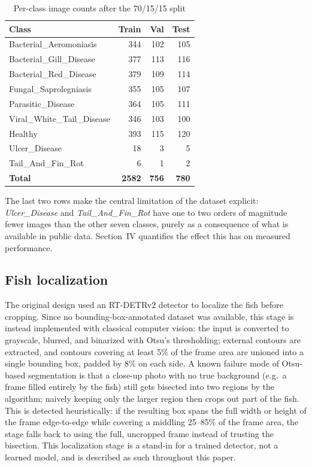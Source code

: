 \documentclass[conference]{IEEEtran}
\begin{document}
\begin{table}[htbp]
\caption{Per-class image counts after the 70/15/15 split}
\label{tab:dataset}
\centering
\begin{tabular}{lrrr}
\toprule
\textbf{Class} & \textbf{Train} & \textbf{Val} & \textbf{Test} \\
\midrule
Bacterial\_Aeromoniasis   & 344 & 102 & 105 \\
Bacterial\_Gill\_Disease  & 377 & 113 & 116 \\
Bacterial\_Red\_Disease   & 379 & 109 & 114 \\
Fungal\_Saprolegniasis    & 355 & 105 & 107 \\
Parasitic\_Disease        & 364 & 105 & 111 \\
Viral\_White\_Tail\_Disease & 346 & 103 & 100 \\
Healthy                   & 393 & 115 & 120 \\
Ulcer\_Disease            &  18 &   3 &   5 \\
Tail\_And\_Fin\_Rot       &   6 &   1 &   2 \\
\midrule
\textbf{Total}            & \textbf{2582} & \textbf{756} & \textbf{780} \\
\bottomrule
\end{tabular}
\end{table}

The last two rows make the central limitation of the dataset explicit: \emph{Ulcer\_Disease} and \emph{Tail\_And\_Fin\_Rot} have one to two orders of magnitude fewer images than the other seven classes, purely as a consequence of what is available in public data. Section~IV quantifies the effect this has on measured performance.

\subsection{Fish localization}
The original design used an RT-DETRv2 detector to localize the fish before cropping. Since no bounding-box-annotated dataset was available, this stage is instead implemented with classical computer vision: the input is converted to grayscale, blurred, and binarized with Otsu's thresholding; external contours are extracted, and contours covering at least 5\% of the frame area are unioned into a single bounding box, padded by 8\% on each side. A known failure mode of Otsu-based segmentation is that a close-up photo with no true background (e.g.\ a frame filled entirely by the fish) still gets bisected into two regions by the algorithm; naively keeping only the larger region then crops out part of the fish. This is detected heuristically: if the resulting box spans the full width or height of the frame edge-to-edge while covering a middling 25--85\% of the frame area, the stage falls back to using the full, uncropped frame instead of trusting the bisection. This localization stage is a stand-in for a trained detector, not a learned model, and is described as such throughout this paper.
\end{document}

